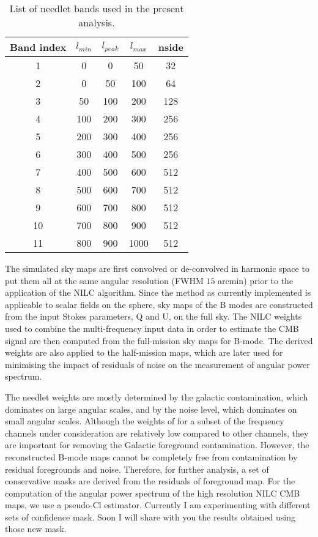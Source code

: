 \documentclass[PICOReport.tex]{subfiles}
\begin{document}
\begin{table}
\caption{List of needlet bands used in the present
  analysis.}  \centering \begin{tabular}{c c c c c} \hline\hline
  Band index & $l_{min}$ & $l_{peak}$ & $l_{max}$ & nside \\ [5ex]
  \hline 1 & 0 & 0 & 50 & 32\\ 2 & 0 & 50 & 100 & 64 \\ 3 & 50 & 100 &
  200 & 128 \\ 4 & 100 & 200 & 300 & 256 \\ 5 & 200 & 300 & 400 & 256
  \\ 6 & 300 & 400 & 500 & 256 \\ 7 & 400 & 500 & 600 & 512 \\ 8 & 500
  & 600 & 700 & 512 \\ 9 & 600 & 700 & 800 & 512 \\ 10 & 700 & 800 & 900 & 512 \\ 11 & 800 & 900 & 1000 & 512\\ [1ex] \hline
\end{tabular} 
\label{tab:needlet-bands} 
\end{table}
The simulated sky maps are first convolved or de-convolved in harmonic space to put them all at the same angular resolution (FWHM $15$ arcmin) prior to the application of the NILC algorithm. Since the method as currently implemented is applicable to scalar fields on the sphere, sky maps of the B modes are constructed from the input Stokes parameters, Q and U, on the full sky. The NILC weights used to combine the multi-frequency input data in order to estimate the CMB signal are then computed from the full-mission sky maps for B-mode. The derived weights are also applied to the half-mission maps, which are later used for minimising the impact of residuals of noise on the measurement of angular power spectrum. 

The needlet weights are mostly determined by the galactic contamination, which dominates on large angular scales, and by the noise level, which dominates on small angular scales. Although the weights of for a subset of the frequency channels under consideration are relatively low compared to other channels, they are important for removing the Galactic foreground contamination. However, the reconstructed B-mode maps cannot be completely free from contamination by residual foregrounds and noise. Therefore, for further analysis, a set of conservative masks are derived from the residuals of foreground map. For the computation of the angular power spectrum of the high resolution NILC CMB maps, we use a pseudo-Cl estimator. Currently I am experimenting with different sets of confidence mask. Soon I will share with you the results obtained using those new mask.
\end{document}
